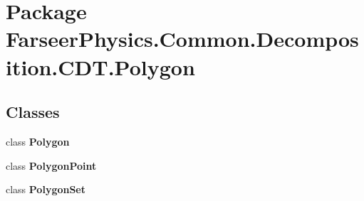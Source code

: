 \hypertarget{namespace_farseer_physics_1_1_common_1_1_decomposition_1_1_c_d_t_1_1_polygon}{\section{Package Farseer\+Physics.\+Common.\+Decomposition.\+C\+D\+T.\+Polygon}
\label{namespace_farseer_physics_1_1_common_1_1_decomposition_1_1_c_d_t_1_1_polygon}
}
\subsection*{Classes}
\begin{DoxyCompactItemize}
\item 
class {\bfseries Polygon}
\item 
class {\bfseries Polygon\+Point}
\item 
class {\bfseries Polygon\+Set}
\end{DoxyCompactItemize}
